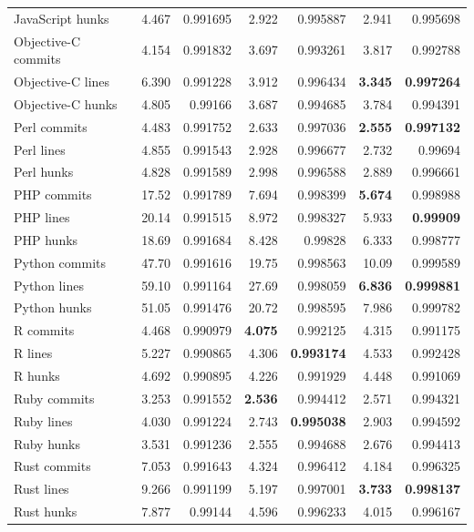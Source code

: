 \documentclass[pdflatex, sn-mathphys, referee]{sn-jnl}%
\theoremstyle{thmstyleone}%
\theoremstyle{thmstyletwo}%
\theoremstyle{thmstylethree}%
\def\tablelinesep{}
\theoremstyle{thmstyleone}
\begin{document}
\begin{table}[ht]
\begin{center}
\begin{minipage}{\textwidth}
\begin{tabular*}{\textwidth}{l r r r r r r}
JavaScript hunks & 4.467 & 0.991695 & 2.922 & 0.995887 & 2.941 & 0.995698 \\ \tablelinesep
Objective-C commits & 4.154 & 0.991832 & 3.697 & 0.993261 & 3.817 & 0.992788 \\
Objective-C lines & 6.390 & 0.991228 & 3.912 & 0.996434 & {\bf 3.345} & {\bf 0.997264} \\
Objective-C hunks & 4.805 & 0.99166 & 3.687 & 0.994685 & 3.784 & 0.994391 \\ \tablelinesep
Perl commits & 4.483 & 0.991752 & 2.633 & 0.997036 & {\bf 2.555} & {\bf 0.997132} \\
Perl lines & 4.855 & 0.991543 & 2.928 & 0.996677 & 2.732 & 0.99694 \\
Perl hunks & 4.828 & 0.991589 & 2.998 & 0.996588 & 2.889 & 0.996661 \\ \tablelinesep
PHP commits & 17.52 & 0.991789 & 7.694 & 0.998399 & {\bf 5.674} & 0.998988 \\
PHP lines & 20.14 & 0.991515 & 8.972 & 0.998327 & 5.933 & {\bf 0.99909} \\
PHP hunks & 18.69 & 0.991684 & 8.428 & 0.99828 & 6.333 & 0.998777 \\ \tablelinesep
Python commits & 47.70 & 0.991616 & 19.75 & 0.998563 & 10.09 & 0.999589 \\
Python lines & 59.10 & 0.991164 & 27.69 & 0.998059 & {\bf 6.836} & {\bf 0.999881} \\
Python hunks & 51.05 & 0.991476 & 20.72 & 0.998595 & 7.986 & 0.999782 \\ \tablelinesep
R commits & 4.468 & 0.990979 & {\bf 4.075} & 0.992125 & 4.315 & 0.991175 \\
R lines & 5.227 & 0.990865 & 4.306 & {\bf 0.993174} & 4.533 & 0.992428 \\
R hunks & 4.692 & 0.990895 & 4.226 & 0.991929 & 4.448 & 0.991069 \\ \tablelinesep
Ruby commits & 3.253 & 0.991552 & {\bf 2.536} & 0.994412 & 2.571 & 0.994321 \\
Ruby lines & 4.030 & 0.991224 & 2.743 & {\bf 0.995038} & 2.903 & 0.994592 \\
Ruby hunks & 3.531 & 0.991236 & 2.555 & 0.994688 & 2.676 & 0.994413 \\ \tablelinesep
Rust commits & 7.053 & 0.991643 & 4.324 & 0.996412 & 4.184 & 0.996325 \\
Rust lines & 9.266 & 0.991199 & 5.197 & 0.997001 & {\bf 3.733} & {\bf 0.998137} \\
Rust hunks & 7.877 & 0.99144 & 4.596 & 0.996233 & 4.015 & 0.996167 \\ \tablelinesep

\end{tabular*}
\end{minipage}
\end{center}
\end{table}
\end{document}
